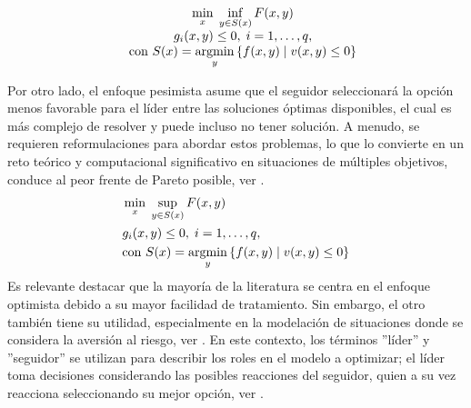     \begin{equation}  \label{eq:EnfoqueOptimistaGeneral}
    \begin{matrix}
    & \displaystyle \min_{x} \; \inf_{y \in S(x)} F(x, y) \\& g_i(x, y)\leq 0,\;i=1,\ldots,q, \\
    & \text{con } S(x) = \displaystyle \operatorname*{argmin}_{y} \left\{ f(x, y) \mid v(x, y) \leq 0 \right\}
    \end{matrix}
    \end{equation}

Por otro lado, el enfoque pesimista asume que el seguidor seleccionará la opción menos favorable para el líder entre las soluciones óptimas disponibles, el cual es más complejo de resolver y puede incluso no tener solución. A menudo, se requieren reformulaciones para abordar estos problemas, lo que lo convierte en un reto teórico y computacional significativo en situaciones de múltiples objetivos, conduce al peor frente de Pareto posible, ver \cite{Sinha2017ARO}.
\begin{equation}
\begin{aligned}
    & \min_{x} \; \sup_{y \in S(x)} F(x, y) \\& g_i(x, y)\leq 0,\;i=1,\ldots,q, \\
& \text{con } S(x) = \operatorname*{argmin}_{y} \left\{ f(x, y) \mid v(x, y) \leq 0 \right\}
\end{aligned}
\label{eq:EnfoquePesimistaGeneral}
\end{equation}
Es relevante destacar que la mayoría de la literatura se centra en el enfoque optimista debido a su mayor facilidad de tratamiento. Sin embargo, el otro también tiene su utilidad, especialmente en la modelación de situaciones donde se considera la aversión al riesgo, ver \cite{DempeyZemkoho2020}. En este contexto, los términos ''líder'' y ''seguidor'' se utilizan para describir los roles en el modelo a optimizar; el líder toma decisiones considerando las posibles reacciones del seguidor, quien a su vez reacciona seleccionando su mejor opción, ver \cite{Sinha2017ARO}.

